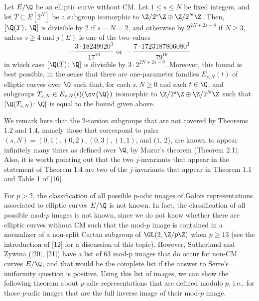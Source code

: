\begin{thm} %
Let $E/\Q$ be an elliptic curve without CM. Let $1 \leq s \leq N$ be fixed integers, and let $T \subseteq E[2^N]$ be a subgroup isomorphic to $\Z/2^s\Z \oplus \Z/2^N\Z$. Then, $[\Q(T) \colon \Q]$ is divisible by 2 if $s= N= 2$, and otherwise by $2^{2N + 2s - 8}$ if $N \geq 3$, unless $s \geq 4$ and $j(E)$ is one of the two values
	\[
	- \dfrac{3 \cdot 18249920^3}{17^{16}} \text{ or } - \dfrac{7 \cdot 1723187806080^3}{79^{16}}
	\]
in which case $[\Q(T) \colon \Q]$ is divisible by $3 \cdot 2^{2N + 2s - 9}$. Moreover, this bound is best possible, in the sense that there are one-parameter families $E_{s,N}(t)$ of elliptic curves over $\Q$ such that, for each $s,N \geq 0$ and each $t \in \Q$, and subgroups $T_{s,N} \in E_{s,N}(t)(\ov{\Q})$ isomorphic to $\Z/2^s\Z \oplus \Z/2^N\Z$ such that $[\Q(T_{s,N}) \colon \Q]$ is equal to the bound given above. 
\end{thm}


We remark here that the 2-torsion subgroups that are not covered by Theorems 1.2 and 1.4, namely those that correspond to pairs $(s, N) = (0, 1), (0, 2), (0, 3), (1, 1)$, and (1, 2), are known to appear infinitely many times as defined over $\Q$, by Mazur’s theorem (Theorem 2.1). Also, it is worth pointing out that the two $j$-invariants that appear in the statement of Theorem 1.4 are two of the $j$-invariants that appear in Theorem 1.1 and Table 1 of [16].


For $p > 2$, the classification of all possible p-adic images of Galois representations associated to elliptic curves $E/\Q$ is not known. In fact, the classification of all possible mod-$p$ images is not known, since we do not know whether there are elliptic curves without CM such that the mod-$p$ image is contained in a normalizer of a non-split Cartan subgroup of $\GL(2, \Z/p\Z)$ when $p \geq 13$ (see the introduction of [12] for a discussion of this topic). However, Sutherland and Zywina ([20], [21]) have
a list of 63 mod-p images that do occur for non-CM curves $E/\Q$, and that would be the complete list if the answer to Serre’s uniformity question is positive. Using this list of images, we can show the following theorem about $p$-adic representations that are defined modulo $p$, i.e., for those $p$-adic images that are the full inverse image of their mod-$p$ image.


